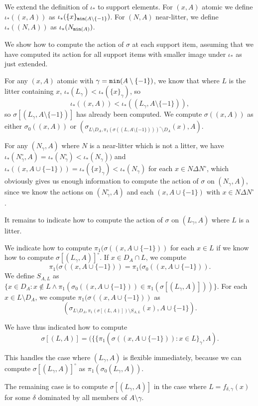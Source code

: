 \documentclass[12pt]{article}
\begin{document}
\begin{enumerate}
We extend the definition of $\iota_*$ to support elements.  For $(x,A)$ atomic we define $\iota_*((x,A))$ as $\iota_*(\{x\}_{{\tt min}(A\setminus \{-1\}})$.  For $(N,A)$ near-litter, we define $\iota_*((N,A))$ as $\iota_*(N_{{\tt min}(A)})$.

We show how to compute the action of $\sigma$ at each support item, assuming that we have computed its action for all support items with smaller image under $\iota_*$ as just extended.

For any $(x,A)$ atomic with $\gamma={\tt min}(A \setminus \{-1\})$, we know that where $L$ is the litter containing $x$, $\iota_*(L_\gamma)<\iota_*(\{x\}_\gamma)$, so $$\iota_*((x,A))<\iota_*((L_\gamma,A \setminus\{-1\})),$$ so $\sigma[(L_\gamma,A\setminus \{-1\})]$ has already been computed.  We compute $\sigma((x,A))$ as either $\sigma_0((x,A))$ or $(\sigma_{L\setminus D_A,\pi_1(\sigma((L,A\setminus \{-1\})))^\circ\setminus D_A}(x),A)$.

For any $(N_\gamma,A)$ where $N$ is a near-litter which is not a litter, we have $\iota_*(N^\circ_\gamma,A) = \iota_*(N^\circ_\gamma)<\iota_*(N_\gamma))$ and $\iota_*((x,A\cup \{-1\})) = \iota_*(\{x\}_\gamma)<\iota_*(N_\gamma)$ for each $x \in N \Delta N^\circ$, which obviously gives us enough information to compute the action of $\sigma$ on $(N_\gamma,A)$,
since we know the actions on $(N^\circ_\gamma,A)$ and each $(x,A\cup \{-1\})$ with $x \in N \Delta N^\circ$.

It remains to indicate how to compute the action of $\sigma$ on $(L_\gamma,A)$ where $L$ is a litter.

We indicate how to compute $\pi_1(\sigma((x,A \cup \{-1\}))$ for each $x \in L$ if we know how to compute $\sigma[(L_\gamma,A)]^\circ$.  If $x \in D_A \cap L$, we compute  $$\pi_1(\sigma((x,A \cup \{-1\}))= \pi_1(\sigma_0((x,A \cup \{-1\})).$$  We define $S_{A,L}$ as $\{x \in D_A: x \not\in L \wedge \pi_1(\sigma_0((x,A \cup \{-1\})) \in \pi_1(\sigma[(L_\gamma,A)]))\}$.
For each $x \in L \setminus D_A$, we compute $\pi_1(\sigma((x,A \cup \{-1\}))$ as $$(\sigma_{L \setminus D_A,\pi_1(\sigma[(L,A)]) \setminus S_{A,L}}(x),A \cup \{-1\}).$$

We have thus indicated how to compute $$\sigma[(L,A)] = (\{\{\pi_1(\sigma((x,A \cup \{-1\})):x \in L\}_\gamma,A).$$

This handles the case where $(L_\gamma,A)$ is flexible immediately, because we can compute $\sigma[(L_\gamma,A)]^\circ$ as $\pi_1(\sigma_0(L_\gamma,A))$.

The remaining case is to compute $\sigma[(L_\gamma,A)]$ in the case where $L = f_{\delta,\gamma}(x)$ for some $\delta$ dominated by all members of $A \setminus \gamma$.


\end{enumerate}
\end{document}
